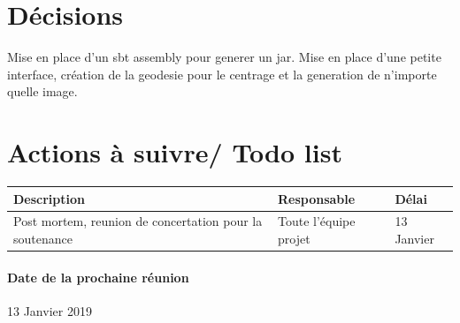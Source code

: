 \documentclass{article}
\begin{document}
\section{Décisions}
 Mise en place d'un sbt assembly pour generer un jar. Mise en place d'une petite interface, création de la geodesie pour le centrage et la generation de n'importe quelle image.



\section{Actions à suivre/ Todo list}

\begin{tabular}{|C{5cm}|C{3cm}|C{3cm}|}
\hline {} Description & Responsable & Délai \\
\hline  Post mortem, reunion de concertation pour la soutenance & Toute l'équipe projet  & 13 Janvier  \\
\hline 
\end{tabular}

\paragraph{Date de la prochaine réunion}
13 Janvier 2019
\end{document}
